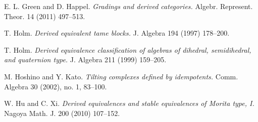 \documentclass{amsart}
\begin{document}
\begin{thebibliography}{99}

 E. L. Green and D. Happel.  \emph{Gradings and derived categories.}  Algebr. Represent. Theor. 14 (2011) 497--513.




 T. Holm.  \emph{Derived equivalent tame blocks.} J. Algebra 194 (1997) 178--200.

 T. Holm. \emph{Derived equivalence classification of algebras of dihedral, semidihedral, and quaternion type.}  J. Algebra 211 (1999) 159--205.

 M. Hoshino and Y.  Kato.  \emph{Tilting complexes defined by idempotents.}  Comm. Algebra 30 (2002), no. 1, 83--100. 




 W. Hu and C. Xi.  \emph{Derived equivalences and stable equivalences of Morita type, I.}  Nagoya Math. J. 200 (2010) 107--152.




\end{thebibliography}
\end{document}
